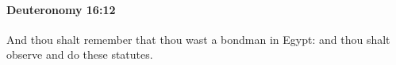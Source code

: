 
		\paragraph{Deuteronomy 16:12} %
			\label{DEUTERONOMY-16-12}

			And thou shalt remember that thou wast a bondman in Egypt: and thou shalt observe and do these statutes.


